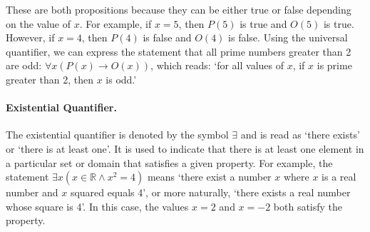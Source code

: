 \documentclass[a4paper, twoside]{article}
\newcommand{\R}{\mathbb{R}}
\newcommand{\rarrow}{\rightarrow}
\begin{document}
These are both propositions because they can be either true or false depending on the value of \(x\). For example, if \(x = 5\), then \(P(5)\) is true and \(O(5)\) is true. However, if \(x = 4\), then \(P(4)\) is false and \(O(4)\) is false. Using the universal quantifier, we can express the statement that all prime numbers greater than 2 are odd: \(\forall x (P(x) \rarrow O(x))\), which reads: `for all values of \(x\), if \(x\) is prime greater than 2, then \(x\) is odd.'

\paragraph{Existential Quantifier.}
The existential quantifier is denoted by the symbol \(\exists\) and is read as `there exists' or `there is at least one'. It is used to indicate that there is at least one element in a particular set or domain that satisfies a given property. For example, the statement \(\exists x ( x \in \R \land x^2 = 4)\) means `there exist a number \(x\) where \(x\) is a real number and \(x\) squared equals 4', or more naturally, `there exists a real number whose square is 4'. In this case, the values \(x = 2\) and \(x = -2\) both satisfy the property.
\end{document}
